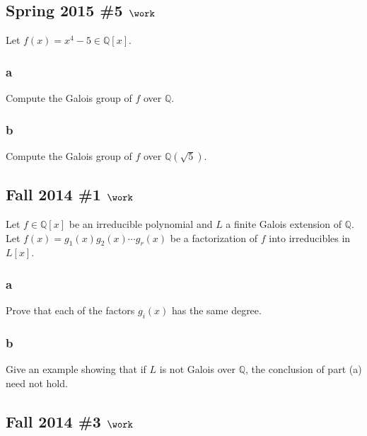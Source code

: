 \hypertarget{spring-2015-5-work}{%
\subsection{\texorpdfstring{Spring 2015 \#5
\(\work\)}{Spring 2015 \#5 \textbackslash work}}\label{spring-2015-5-work}}

Let \(f(x) = x^4 - 5 \in {\mathbb{Q}}[x]\).

\hypertarget{a-73}{%
\subsubsection{a}\label{a-73}}

Compute the Galois group of \(f\) over \({\mathbb{Q}}\).

\hypertarget{b-63}{%
\subsubsection{b}\label{b-63}}

Compute the Galois group of \(f\) over \({\mathbb{Q}}(\sqrt{5})\).

\hypertarget{fall-2014-1-work}{%
\subsection{\texorpdfstring{Fall 2014 \#1
\(\work\)}{Fall 2014 \#1 \textbackslash work}}\label{fall-2014-1-work}}

Let \(f\in {\mathbb{Q}}[x]\) be an irreducible polynomial and \(L\) a
finite Galois extension of \({\mathbb{Q}}\). Let
\(f(x) = g_1(x)g_2(x)\cdots g_r(x)\) be a factorization of \(f\) into
irreducibles in \(L[x]\).

\hypertarget{a-74}{%
\subsubsection{a}\label{a-74}}

Prove that each of the factors \(g_i(x)\) has the same degree.

\hypertarget{b-64}{%
\subsubsection{b}\label{b-64}}

Give an example showing that if \(L\) is not Galois over
\({\mathbb{Q}}\), the conclusion of part (a) need not hold.

\hypertarget{fall-2014-3-work}{%
\subsection{\texorpdfstring{Fall 2014 \#3
\(\work\)}{Fall 2014 \#3 \textbackslash work}}\label{fall-2014-3-work}}

